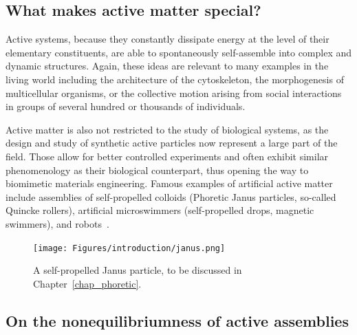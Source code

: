 
\subsection*{What makes active matter special?}

Active systems, because they constantly dissipate energy at the level of their elementary constituents, 
are able to spontaneously self-assemble into complex and dynamic structures. 
Again, these ideas are relevant to many examples in the living world including the architecture of the cytoskeleton, the morphogenesis of multicellular organisms, or the collective motion arising from social interactions in groups of several hundred or thousands of individuals. 

Active matter is also not restricted to the study of biological systems, as the design and study of synthetic active particles now represent a large part of the field. Those allow for better controlled experiments and often exhibit similar phenomenology as their biological counterpart, thus opening the way to biomimetic materials engineering. 
Famous examples of artificial active matter include assemblies of self-propelled colloids (Phoretic Janus particles, so-called Quincke rollers), artificial microswimmers (self-propelled drops, magnetic swimmers), and robots~\cite{BechingerRMP2016}.

\begin{figure}[!htb]
    \centering
    \texttt{[image: Figures/introduction/janus.png]}
    \caption{A self-propelled Janus particle, to be discussed in Chapter~\ref{chap_phoretic}.}
    \label{fig: janus}
\end{figure}



\subsection*{On the nonequilibriumness of active assemblies}

